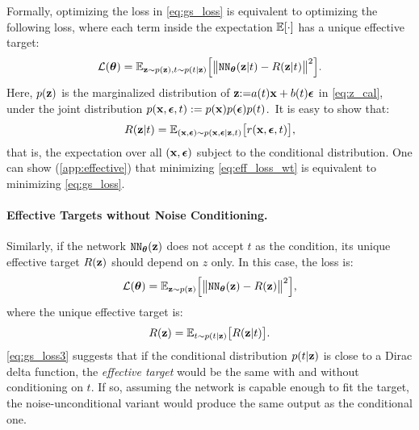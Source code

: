 Formally, optimizing the loss in \cref{eq:gs_loss} is equivalent to optimizing the following loss, where each term inside the expectation $\mathbb{E}[\cdot]$ has a unique effective target:
\begin{align}\label{eq:eff_loss_wt}
    \mathcal{L}({\bm{\theta}}) = \mathbb{E}_{{\mathbf{z}} \sim p({\mathbf{z}}), t \sim p(t|{\mathbf{z}}) }\Big[\big\|{\texttt{NN}}_{{\bm{\theta}}}({\mathbf{z}}|t)-R({\mathbf{z}}|t)\big\|^2\Big].
\end{align}
Here, $p({\mathbf{z}})$ is the marginalized distribution of ${\mathbf{z}}{:=}a(t){\mathbf{x}} + b(t){\bm{\epsilon}}$ in \cref{eq:z_cal}, under the joint distribution $p({\mathbf{x}}, {\bm{\epsilon}}, t):=p({\mathbf{x}})p({\bm{\epsilon}})p(t)$.\footnotemark~It is easy to show that:
\begin{align}
\label{eq:gs_loss2}
R({\mathbf{z}}|t) = \mathbb{E}_{({\mathbf{x}}, {\bm{\epsilon}}) \sim p({\mathbf{x}}, {\bm{\epsilon}} | {\mathbf{z}}, t)} \big[ r({\mathbf{x}},{\bm{\epsilon}},t) \big],
\end{align}
that is, the expectation over all $({\mathbf{x}}, {\bm{\epsilon}})$ subject to the conditional distribution. One can show (\cref{app:effective}) that minimizing \cref{eq:eff_loss_wt} is equivalent to minimizing \cref{eq:gs_loss}.


\paragraph{Effective Targets without Noise Conditioning.}

Similarly, if the network ${\texttt{NN}}_{{\bm{\theta}}}({\mathbf{z}})$ does not accept $t$ as the condition, its unique effective target $R({\mathbf{z}})$ should depend on $z$ only. In this case, the loss is:
\begin{align}\label{eq:eff_loss_wot}
    \mathcal{L}({\bm{\theta}}) = \mathbb{E}_{{\mathbf{z}} \sim p({\mathbf{z}}) }\Big[\big\|{\texttt{NN}}_{{\bm{\theta}}}({\mathbf{z}})-R({\mathbf{z}})\big\|^2\Big],
\end{align}
where the unique effective target is:
\begin{align}
\label{eq:gs_loss3}
R({\mathbf{z}}) = \mathbb{E}_{t\sim p(t|{\mathbf{z}})} \big[R({\mathbf{z}}| t)\big].
\end{align}
\cref{eq:gs_loss3} suggests that if the conditional distribution $p(t | {\mathbf{z}})$ is close to a Dirac delta function, the \textit{effective target} would be the same with and without conditioning on $t$. If so, assuming the network is capable enough to fit the target, the noise-unconditional variant would produce the same output as the conditional one.

